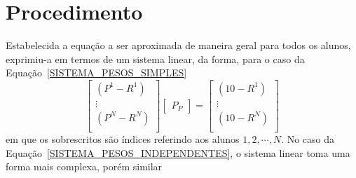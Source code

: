 \documentclass[11pt]{article}
\begin{document}
        \section{Procedimento}
                Estabelecida a equação a ser aproximada de
                maneira geral para todos os alunos, exprimiu-a
                em termos de um sistema linear, da forma,
                para o caso da
                Equação~\ref{SISTEMA_PESOS_SIMPLES}
                \begin{equation}
                        \begin{bmatrix}
                                (P^1 - R^1) \\
                                \vdots      \\
                                (P^N - R^N) \\
                        \end{bmatrix}
                        \begin{bmatrix}
                                P_P
                        \end{bmatrix}
                        =
                        \begin{bmatrix}
                                (10 - R^1) \\
                                \vdots      \\
                                (10 - R^N) \\
                        \end{bmatrix}
                        \label{LINEAR_PESOS_SIMPLES}
                \end{equation}
                em que os sobrescritos são índices referindo
                aos alunos $1,2,\cdots,N$. No caso da
                Equação~\ref{SISTEMA_PESOS_INDEPENDENTES},
                o sistema linear toma uma forma mais
                complexa, porém similar
\end{document}
